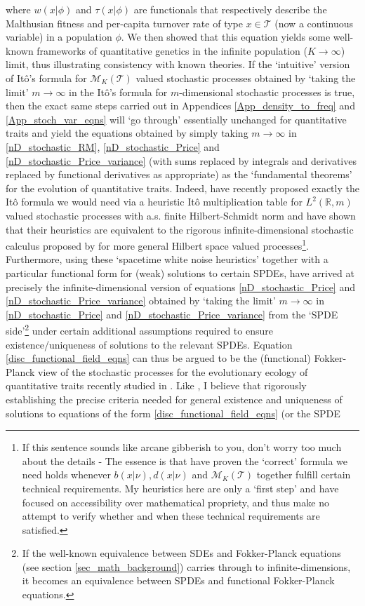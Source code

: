 where $w(x|\phi)$ and $\tau(x|\phi)$ are functionals that respectively describe the Malthusian fitness and per-capita turnover rate of type $x \in \mathcal{T}$ (now a continuous variable) in a population $\phi$. We then showed that this equation yields some well-known frameworks of quantitative genetics in the infinite population ($K \to \infty$) limit, thus illustrating consistency with known theories. If the `intuitive' version of It\^{o}'s formula for $\mathcal{M}_K(\mathcal{T})$ valued stochastic processes obtained by `taking the limit' $m \to \infty$ in the It\^{o}'s formula for $m$-dimensional stochastic processes is true, then the exact same steps carried out in Appendices \ref{App_density_to_freq} and \ref{App_stoch_var_eqns} will `go through' essentially unchanged for quantitative traits and yield the equations obtained by simply taking $m \to \infty$ in \eqref{nD_stochastic_RM}, \eqref{nD_stochastic_Price} and \eqref{nD_stochastic_Price_variance} (with sums replaced by integrals and derivatives replaced by functional derivatives as appropriate) as the `fundamental theorems' for the evolution of quantitative traits. Indeed, \cite{week_white_2021} have recently proposed exactly the It\^o formula we would need via a heuristic It\^o multiplication table for $L^2(\mathbb{R}, m)$ valued stochastic processes with a.s. finite Hilbert-Schmidt norm and have shown that their heuristics are equivalent to the rigorous infinite-dimensional stochastic calculus proposed by \cite{da_prato_stochastic_2014} for more general Hilbert space valued processes\footnote{If this sentence sounds like arcane gibberish to you, don't worry too much about the details - The essence is that \cite{week_white_2021} have proven the `correct' formula we need holds whenever $b(x|\nu), d(x|\nu)$ and $\mathcal{M}_K(\mathcal{T})$ together fulfill certain technical requirements. My heuristics here are only a `first step' and have focused on accessibility over mathematical propriety, and thus make no attempt to verify whether and when these technical requirements are satisfied.}. Furthermore, using these `spacetime white noise heuristics' together with a particular functional form for (weak) solutions to certain SPDEs, \cite{week_white_2021} have arrived at precisely the infinite-dimensional version of equations \eqref{nD_stochastic_Price} and \eqref{nD_stochastic_Price_variance} obtained by `taking the limit' $m \to \infty$ in \eqref{nD_stochastic_Price} and \eqref{nD_stochastic_Price_variance} from the `SPDE side'\footnote{If the well-known equivalence between SDEs and Fokker-Planck equations (see section \ref{sec_math_background}) carries through to infinite-dimensions, it becomes an equivalence between SPDEs and functional Fokker-Planck equations.} under certain additional assumptions required to ensure existence/uniqueness of solutions to the relevant SPDEs. Equation \eqref{disc_functional_field_eqns} can thus be argued to be the (functional) Fokker-Planck view of the stochastic processes for the evolutionary ecology of quantitative traits recently studied in \cite{week_white_2021}. Like \cite{week_white_2021}, I believe that rigorously establishing the precise criteria needed for general existence and uniqueness of solutions to equations of the form \eqref{disc_functional_field_eqns} (or the SPDE 